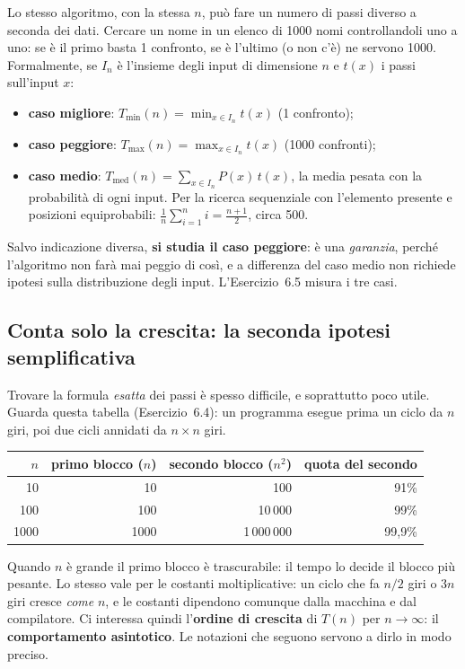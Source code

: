 Lo stesso algoritmo, con la stessa $n$, può fare un numero di passi diverso a
seconda dei dati. Cercare un nome in un elenco di 1000 nomi controllandoli uno a uno:
se è il primo basta 1 confronto, se è l'ultimo (o non c'è) ne servono 1000.
Formalmente, se $I_n$ è l'insieme degli input di dimensione $n$ e $t(x)$ i passi
sull'input $x$:
\begin{itemize}
  \item \textbf{caso migliore}: $T_{\min}(n) = \min_{x \in I_n} t(x)$ (1 confronto);
  \item \textbf{caso peggiore}: $T_{\max}(n) = \max_{x \in I_n} t(x)$ (1000 confronti);
  \item \textbf{caso medio}: $T_{\text{med}}(n) = \sum_{x \in I_n} P(x)\, t(x)$, la media
        pesata con la probabilità di ogni input. Per la ricerca sequenziale con
        l'elemento presente e posizioni equiprobabili:
        $\frac{1}{n}\sum_{i=1}^{n} i = \frac{n+1}{2}$, circa 500.
\end{itemize}
Salvo indicazione diversa, \textbf{si studia il caso peggiore}: è una
\emph{garanzia}, perché l'algoritmo non farà mai peggio di così, e a differenza del
caso medio non richiede ipotesi sulla distribuzione degli input.
L'Esercizio~6.5 misura i tre casi.

\subsection*{Conta solo la crescita: la seconda ipotesi semplificativa}

Trovare la formula \emph{esatta} dei passi è spesso difficile, e soprattutto poco
utile. Guarda questa tabella (Esercizio~6.4): un programma esegue prima un ciclo
da $n$ giri, poi due cicli annidati da $n \times n$ giri.

\begin{center}
\begin{tabular}{rrrr}
\toprule
$n$ & primo blocco ($n$) & secondo blocco ($n^2$) & quota del secondo \\
\midrule
10   & 10    & 100        & 91\% \\
100  & 100   & 10\,000    & 99\% \\
1000 & 1000  & 1\,000\,000 & 99,9\% \\
\bottomrule
\end{tabular}
\end{center}
Quando $n$ è grande il primo blocco è trascurabile: il tempo lo decide il blocco più
pesante. Lo stesso vale per le costanti moltiplicative: un ciclo che fa $n/2$ giri o
$3n$ giri cresce \emph{come} $n$, e le costanti dipendono comunque dalla macchina e
dal compilatore. Ci interessa quindi l'\textbf{ordine di crescita} di $T(n)$ per
$n \to \infty$: il \textbf{comportamento asintotico}. Le notazioni che seguono servono
a dirlo in modo preciso.

